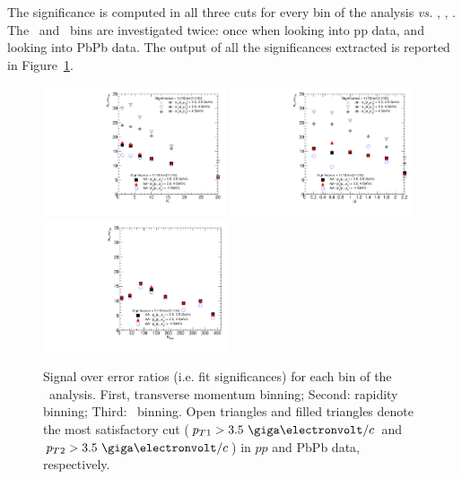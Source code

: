 The significance is computed in all three cuts for every bin of the
analysis \textit{vs.} \Npart, \pt, \y. The \pt\ and \y\ bins are
investigated twice: once when looking into pp data, and looking into
PbPb data. The output of all the significances extracted is reported
in Figure~\ref{fig:significance}.
\begin{figure}[h]
\begin{center}
\includegraphics[width=0.48\textwidth]{Chapters/aYield/signif_pp1_pbpb1_pt1_rap0.pdf}
\includegraphics[width=0.48\textwidth]{Chapters/aYield/signif_pp1_pbpb1_pt0_rap1.pdf}
\includegraphics[width=0.49\textwidth]{Chapters/aYield/signif_pp0_pbpb1_pt0_rap0.pdf}
\caption{Signal over error ratios (i.e. fit significances) for each bin of the \PgUa\
  analysis. First, transverse momentum binning; Second: rapidity
  binning; Third: \Npart\ binning. Open triangles and filled
  triangles denote the most satisfactory cut ($\pt{}_{1} > 3.5~\GeVc$ and
$\pt{}_{2} > 3.5~\GeVc$) in $pp$ and PbPb data, respectively.}
\label{fig:significance}
\end{center}
\end{figure}

